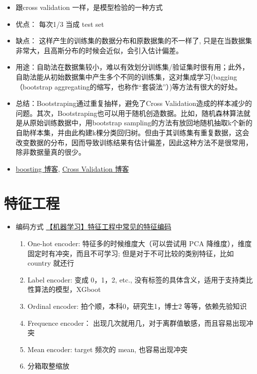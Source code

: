 \documentclass[12pt]{article}
\numberwithin{theorem}{section} %
\numberwithin{definition}{section} %
\numberwithin{assumption}{section} %
\numberwithin{lemma}{section} %
\numberwithin{remark}{section} %
\numberwithin{prop}{section} %
\numberwithin{corollary}{section} %
\numberwithin{example}{section} %
\numberwithin{question}{section} %
\numberwithin{problem}{section} %
\numberwithin{conjecture}{section} %
\numberwithin{append}{section} %
\numberwithin{property}{section} %
\begin{document}
\begin{CJK}{UTF8}{gbsn}
\begin{itemize}
	\item 跟cross validation 一样，是模型检验的一种方式
	\item 优点： 每次1/3 当成 test set
	\item 缺点： 这样产生的训练集的数据分布和原数据集的不一样了, 只是在当数据集非常大，且高斯分布的时候会近似，会引入估计偏差。
	\item 用途：自助法在数据集较小，难以有效划分训练集/验证集时很有用；此外，自助法能从初始数据集中产生多个不同的训练集，这对集成学习(bagging（bootstrap aggregating的缩写，也称作“套袋法”）)等方法有很大的好处。
	\item 总结：Bootstraping通过重复抽样，避免了Cross Validation造成的样本减少的问题。其次，Bootstraping也可以用于随机创造数据。比如，随机森林算法就是从原始训练数据中，用bootstrap sampling的方法有放回地随机抽取k个新的自助样本集，并由此构建k棵分类回归树。但由于其训练集有重复数据，这会改变数据的分布，因而导致训练结果有估计偏差，因此这种方法不是很常用，除非数据量真的很少。
	\item \href{https://www.cnblogs.com/HuZihu/p/11145518.html}{boosting 博客}, \href{https://www.cnblogs.com/HuZihu/p/9368362.html}{Cross Validation 博客}
\end{itemize}

\section{特征工程}

\begin{itemize}
	\item 编码方式 \href{https://blog.csdn.net/m0_61796189/article/details/127332472}{【机器学习】特征工程中常见的特征编码}
	\begin{enumerate}
		\item One-hot encoder: 特征多的时候维度大（可以尝试用 PCA 降维度），维度固定时有冲突，而且不可学习; 但是对于不可比较的类别特征，比如 country 就还行
		\item Label encoder: 变成 0，1，2, etc., 没有标签的具体含义，适用于支持类比性算法的模型，XGboot
		\item Ordinal encoder: 拍个顺，本科0，研究生1，博士2 等等，依赖先验知识
		\item Frequence encoder： 出现几次就用几，对于离群值敏感，而且容易出现冲突
	 	\item  Mean encoder: target 频次的 mean, 也容易出现冲突
	 	\item 分箱取整缩放
	\end{enumerate}
\end{itemize}


\end{CJK}
\end{document}
